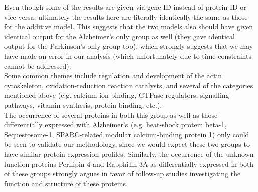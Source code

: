 Even though some of the results are given via gene ID instead of protein ID or vice versa, ultimately the results here are literally identically the same as those for the additive model. This suggests that the two models also should have given identical output for the Alzheimer's only group as well (they gave identical output for the Parkinson's only group too), which strongly suggests that we may have made an error in our analysis (which unfortunately due to time constraints cannot be addressed).\\

Some common themes include regulation and development of the actin cytoskeleton, oxidation-reduction reaction catalysts, and several of the categories mentioned above (e.g. calcium ion binding, GTPase regulators, signalling pathways, vitamin synthesis, protein binding, etc.).\\

The occurrence of several proteins in both this group as well as those differentially expressed with Alzheimer's (e.g. heat-shock protein beta-1, Sequestosome-1, SPARC-related modular calcium-binding protein 1) only could be seen to validate our methodology, since we would expect these two groups to have similar protein expression profiles. Similarly, the occurrence of the unknown function proteins Perilipin-4 and Rabphilin-3A as differentially expressed in both of these groups strongly argues in favor of follow-up studies investigating the function and structure of these proteins.\\

